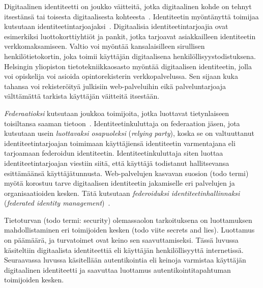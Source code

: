 \documentclass[finnish,gradu]{tktltiki}
\begin{document}
  Digitaalinen identiteetti on joukko väitteitä, jotka digitaalinen kohde on tehnyt itsestänsä tai toisesta digitaalisesta kohteesta~\cite{cameron_laws_of_id_2005, sakimura_identity_2011}. Identiteetin myöntänyttä toimijaa kutsutaan identiteetintarjoajaksi~\cite{cameron_id_arch_2006}. Digitaalisia identiteetintarjoajia ovat esimerkiksi luottokorttiyhtiöt ja pankit, jotka tarjoavat asiakkailleen identiteetin verkkomaksamiseen. Valtio voi myöntää kansalaisilleen sirullisen henkilötietokortin, joka toimii käyttäjän digitaalisena henkilöllisyystodistuksena. Helsingin yliopiston tietotekniikkaosasto myöntää digitaalisen identiteetin, jolla voi opiskelija voi asioida opintorekisterin verkkopalvelussa. Sen sijaan kuka tahansa voi rekisteröityä julkisiin web-palveluihin eikä palveluntarjoaja välttämättä tarkista käyttäjän väitteitä itsestään.

  \emph{Federaatioksi} kutsutaan joukkoa toimijoita, jotka luottavat tietynlaiseen toisiltansa saaman tietoon~\cite{id_in_federation_systems_2005, federated_auth_case_2008}. Identiteetinkuluttaja on federaation jäsen, jota kutsutaan usein \emph{luottavaksi osapuoleksi} (\emph{relying party}), koska se on valtuuttanut identiteetintarjoajan toimimaan käyttäjiensä identiteetin varmentajana eli tarjoamaan federoidun identiteetin. Identiteetinkuluttaja siten luottaa identiteetintarjoajan viestiin siitä, että käyttäjä todistanut hallitsevansa esittämäänsä käyttäjätunnusta. Web-palvelujen kasvavan suosion (todo termi) myötä korostuu tarve digitaalisen identiteetin jakamiselle eri palvelujen ja organisaatioiden kesken. Tätä kutsutaan \emph{federoiduksi identiteetinhallinnaksi} (\emph{federated identity management})~\cite{id_in_federation_systems_2005}.

  Tietoturvan (todo termi: security) olemassaolon tarkoituksena on luottamuksen mahdollistaminen eri toimijoiden kesken (todo viite secrets and lies). Luottamus on päämäärä, ja turvatoimet ovat keino sen saavuttamiseksi. Tässä luvussa käsiteltiin digitaalista identiteettiä eli käyttäjän henkilöllisyyttä internetissä. Seuraavassa luvussa käsitellään autentikointia eli keinoja varmistaa käyttäjän digitaalinen identiteetti ja saavuttaa luottamus autentikointitapahtuman toimijoiden kesken.

\end{document}
